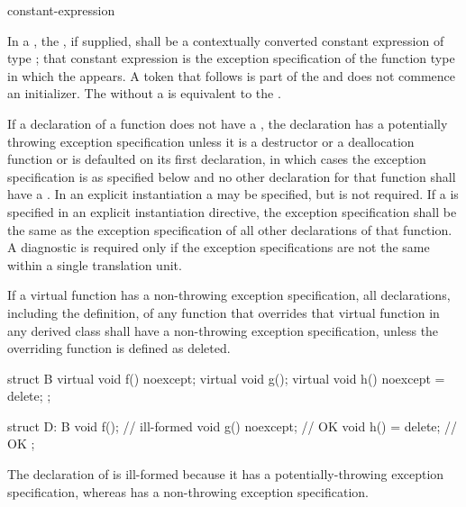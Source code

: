 \begin{bnf}
\br
     \terminal{(} constant-expression \terminal{)}\br
    \br
\end{bnf}

\pnum
{}%
In a , the ,
if supplied, shall be a contextually converted constant expression
of type ;
that constant expression is the exception specification of
the function type in which the  appears.
A \tcode{(} token that follows  is part of the
 and does not commence an
initializer.
The  
without a 
is
equivalent to the 
.

\pnum
If a declaration of a function
does not have a ,
the declaration has a potentially throwing exception specification
unless it is a destructor or a deallocation function
or is defaulted on its first declaration,
in which cases the exception specification
is as specified below
and no other declaration for that function
shall have a .
In an explicit instantiation
a  may be specified,
but is not required.
If a  is specified
in an explicit instantiation directive,
the exception specification shall be the same as
the exception specification of all other declarations of that function.
A diagnostic is required only if the
exception specifications are not the same
within a single translation unit.

\pnum
{}%
If a virtual function has a
non-throwing exception specification,
all declarations, including the definition, of any function
that overrides that virtual function in any derived class
shall have a non-throwing
exception specification,
unless the overriding function is defined as deleted.
\begin{example}
\begin{codeblock}
struct B {
  virtual void f() noexcept;
  virtual void g();
  virtual void h() noexcept = delete;
};

struct D: B {
  void f();                     // ill-formed
  void g() noexcept;            // OK
  void h() = delete;            // OK
};
\end{codeblock}

The declaration of
is ill-formed because it
has a potentially-throwing exception specification,
whereas
has a non-throwing exception specification.
\end{example}

